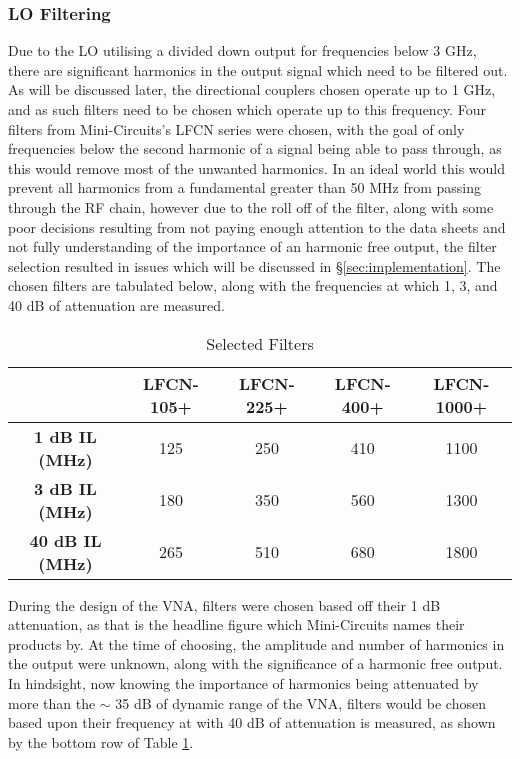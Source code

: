 \subsubsection{LO Filtering}
Due to the LO utilising a divided down output for frequencies below 3 GHz, there are significant harmonics in the output signal which need to be filtered out. As will be discussed later, the directional couplers chosen operate up to 1 GHz, and as such filters need to be chosen which operate up to this frequency. Four filters from Mini-Circuits's LFCN series were chosen, with the goal of only frequencies below the second harmonic of a signal being able to pass through, as this would remove most of the unwanted harmonics. In an ideal world this would prevent all harmonics from a fundamental greater than 50 MHz from passing through the RF chain,  however due to the roll off of the filter, along with some poor decisions resulting from not paying enough attention to the data sheets and not fully understanding of the importance of an harmonic free output, the filter selection resulted in issues which will be discussed in \S \ref{sec:implementation}. The chosen filters are tabulated below, along with the frequencies at which 1, 3, and 40 dB of attenuation are measured. 

\begin{table}[H]
	\caption{Selected Filters}
	\label{table:selected_filters}
	\centering
	\begin{tabular}{|c|c|c|c|c|}
		\hline
		\textbf{}               & \textbf{LFCN-105+} & \textbf{LFCN-225+} & \textbf{LFCN-400+} & \textbf{LFCN-1000+} \\ \hline
		\textbf{1 dB IL (MHz)}  & 125                & 250                & 410                & 1100                \\ \hline
		\textbf{3 dB IL (MHz)}  & 180                & 350                & 560                & 1300                \\ \hline
		\textbf{40 dB IL (MHz)} & 265                & 510                & 680                & 1800                \\ \hline
	\end{tabular}
\end{table}

During the design of the VNA, filters were chosen based off their 1 dB attenuation, as that is the headline figure which Mini-Circuits names their products by. At the time of choosing, the amplitude and number of harmonics in the output were unknown, along with the significance of a harmonic free output. In hindsight, now knowing the importance of harmonics being attenuated by more than the $\sim$ 35 dB of dynamic range of the VNA, filters would be chosen based upon their frequency at with 40 dB of attenuation is measured, as shown by the bottom row of Table \ref{table:selected_filters}. 

